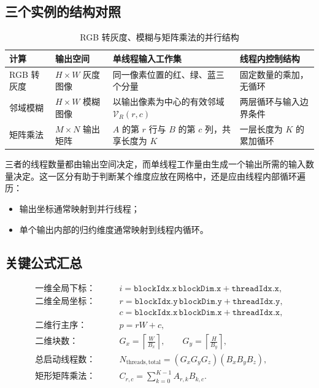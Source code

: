 \subsection{三个实例的结构对照}

\begin{table}[H]
\centering
\caption{RGB 转灰度、模糊与矩阵乘法的并行结构}
\begin{tabularx}{\textwidth}{>{\raggedright\arraybackslash}p{} >{\raggedright\arraybackslash}p{} >{\raggedright\arraybackslash}p{} X}
\toprule
计算 & 输出空间 & 单线程输入工作集 & 线程内控制结构 \\
\midrule
RGB 转灰度 & $H\times W$ 灰度图像 & 同一像素位置的红、绿、蓝三个分量 & 固定数量的乘加，无循环 \\
邻域模糊 & $H\times W$ 模糊图像 & 以输出像素为中心的有效邻域 $\mathcal{V}_R(r,c)$ & 两层循环与输入边界条件 \\
矩阵乘法 & $M\times N$ 输出矩阵 & $A$ 的第 $r$ 行与 $B$ 的第 $c$ 列，共享长度为 $K$ & 一层长度为 $K$ 的累加循环 \\
\bottomrule
\end{tabularx}
\end{table}

三者的线程数量都由输出空间决定，而单线程工作量由生成一个输出所需的输入数量决定。这一区分有助于判断某个维度应放在网格中，还是应由线程内部循环遍历：
\begin{itemize}
  \item 输出坐标通常映射到并行线程；
  \item 单个输出内部的归约维度通常映射到线程内循环。
\end{itemize}

\subsection{关键公式汇总}

\begin{align*}
\text{一维全局下标：}\qquad
&i=\texttt{blockIdx.x}\,\texttt{blockDim.x}+\texttt{threadIdx.x},\\[1mm]
\text{二维全局坐标：}\qquad
&r=\texttt{blockIdx.y}\,\texttt{blockDim.y}+\texttt{threadIdx.y},\\
&c=\texttt{blockIdx.x}\,\texttt{blockDim.x}+\texttt{threadIdx.x},\\[1mm]
\text{二维行主序：}\qquad
&p=rW+c,\\[1mm]
\text{二维块数：}\qquad
&G_x=\left\lceil\frac{W}{B_x}\right\rceil,
\qquad
G_y=\left\lceil\frac{H}{B_y}\right\rceil,\\[1mm]
\text{总启动线程数：}\qquad
&N_{\mathrm{threads,total}}
=(G_xG_yG_z)(B_xB_yB_z),\\[1mm]
\text{矩形矩阵乘法：}\qquad
&C_{r,c}=\sum_{k=0}^{K-1}A_{r,k}B_{k,c}.
\end{align*}

